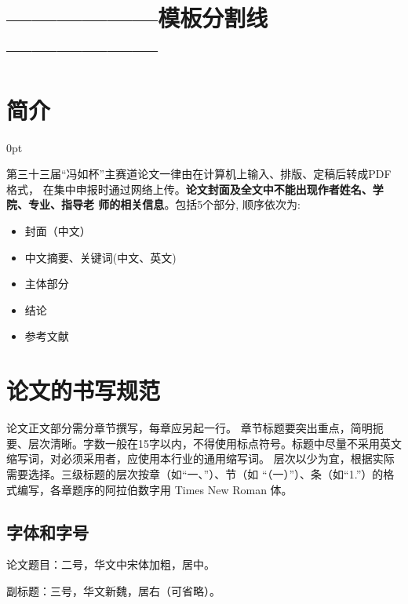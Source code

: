 \documentclass[zihao=-4]{ctexart}
\newcommand{\setParDis}{\setlength {\parskip} {0pt} }
\begin{document}

\section{——————模板分割线——————}
\section{简介}
\setParDis %
\begin{spacing}{1.5}
  第三十三届“冯如杯”主赛道论文一律由在计算机上输入、排版、定稿后转成PDF格式，
在集中申报时通过网络上传。\textbf{论文封面及全文中不能出现作者姓名、学院、专业、指导老
师的相关信息}。包括5个部分, 顺序依次为: \par 
  \begin{itemize}
    \item 封面（中文）
    \item 中文摘要、关键词(中文、英文)
    \item 主体部分
    \item 结论
    \item 参考文献
  \end{itemize}

\section{论文的书写规范}

论文正文部分需分章节撰写，每章应另起一行。
章节标题要突出重点，简明扼要、层次清晰。字数一般在15字以内，不得使用标点符号。标题中尽量不采用英文缩写词，对必须采用者，应使用本行业的通用缩写词。  层次以少为宜，根据实际需要选择。三级标题的层次按章（如“一、”）、节（如 “（一）”）、条（如“1.”）的格式编写，各章题序的阿拉伯数字用 Times New Roman 体。  

\subsection{字体和字号}
论文题目：二号，华文中宋体加粗，居中。

副标题：三号，华文新魏，居右（可省略）。


\end{spacing}
\end{document}

